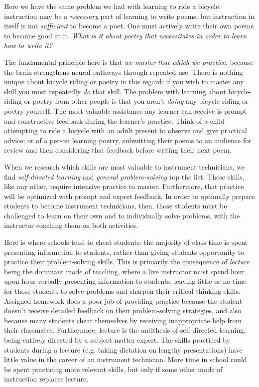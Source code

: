 Here we have the same problem we had with learning to ride a bicycle: instruction may be a {\it necessary} part of learning to write poems, but instruction in itself is not {\it sufficient} to become a poet.  One must actively write their own poems to become good at it.  {\it What is it about poetry that necessitates  in order to learn how to write it?}

\vskip 10pt

The fundamental principle here is that {\it we master that which we practice}, because the brain strengthens neural pathways through repeated use.  There is nothing unique about bicycle riding or poetry in this regard: if you wish to master any skill you must repeatedly {\it do} that skill.  The problem with learning about bicycle-riding or poetry from other people is that you aren't {\it doing} any bicycle riding or poetry yourself.  The most valuable assistance any learner can receive is prompt and constructive feedback during the learner's practice.  Think of a child attempting to ride a bicycle with an adult present to observe and give practical advice; or of a person learning poetry, submitting their poems to an audience for review and then considering that feedback before writing their next poem.

When we research which skills are most valuable to instrument technicians, we find {\it self-directed learning} and {\it general problem-solving} top the list.  These skills, like any other, require intensive practice to master.  Furthermore, that practice will be optimized with prompt and expert feedback.  In order to optimally prepare students to become instrument technicians, then, those students must be challenged to learn on their own and to individually solve problems, with the instructor coaching them on both activities.

Here is where schools tend to cheat students: the majority of class time is spent presenting information to students, rather than giving students opportunity to practice their problem-solving skills.  This is primarily the consequence of {\it lecture} being the dominant mode of teaching, where a live instructor must spend hour upon hour verbally presenting information to students, leaving little or no time for those students to solve problems and sharpen their critical thinking skills.  Assigned homework does a poor job of providing practice because the student doesn't receive detailed feedback on their problem-solving strategies, and also because many students cheat themselves by receiving inappropriate help from their classmates.  Furthermore, lecture is the antithesis of self-directed learning, being entirely directed by a subject matter expert.  The skills practiced by students during a lecture (e.g. taking dictation on lengthy presentations) have little value in the career of an instrument technician.  More time in school could be spent practicing more relevant skills, but only if some other mode of instruction replaces lecture.


